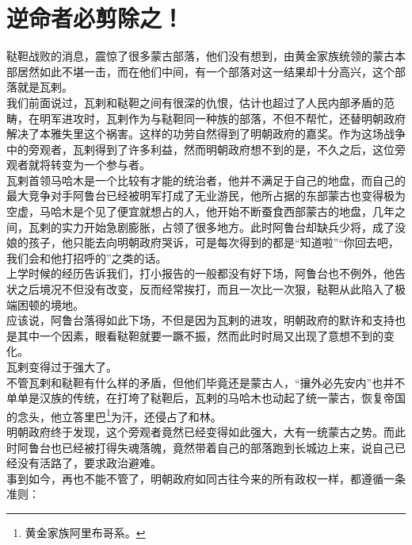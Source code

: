 \section{逆命者必剪除之！}
\ifnum{}
	\begin{multicols}{\theparacolNo}
\fi
鞑靼战败的消息，震惊了很多蒙古部落，他们没有想到，由黄金家族统领的蒙古本部居然如此不堪一击，而在他们中间，有一个部落对这一结果却十分高兴，这个部落就是瓦剌。\\

我们前面说过，瓦剌和鞑靼之间有很深的仇恨，估计也超过了人民内部矛盾的范畴，在明军进攻时，瓦剌作为与鞑靼同一种族的部落，不但不帮忙，还替明朝政府解决了本雅失里这个祸害。这样的功劳自然得到了明朝政府的嘉奖。作为这场战争中的旁观者，瓦剌得到了许多利益，然而明朝政府想不到的是，不久之后，这位旁观者就将转变为一个参与者。\\

瓦剌首领马哈木是一个比较有才能的统治者，他并不满足于自己的地盘，而自己的最大竞争对手阿鲁台已经被明军打成了无业游民，他所占据的东部蒙古也变得极为空虚，马哈木是个见了便宜就想占的人，他开始不断蚕食西部蒙古的地盘，几年之间，瓦剌的实力开始急剧膨胀，占领了很多地方。此时阿鲁台却缺兵少将，成了没娘的孩子，他只能去向明朝政府哭诉，可是每次得到的都是“知道啦”“你回去吧，我们会和他打招呼的”之类的话。\\

上学时候的经历告诉我们，打小报告的一般都没有好下场，阿鲁台也不例外，他告状之后境况不但没有改变，反而经常挨打，而且一次比一次狠，鞑靼从此陷入了极端困顿的境地。\\

应该说，阿鲁台落得如此下场，不但是因为瓦剌的进攻，明朝政府的默许和支持也是其中一个因素，眼看鞑靼就要一蹶不振，然而此时时局又出现了意想不到的变化。\\

瓦剌变得过于强大了。\\

不管瓦剌和鞑靼有什么样的矛盾，但他们毕竟还是蒙古人，“攘外必先安内”也并不单单是汉族的传统，在打垮了鞑靼后，瓦剌的马哈木也动起了统一蒙古，恢复帝国的念头，他立答里巴\footnote{黄金家族阿里布哥系。}为汗，还侵占了和林。\\

明朝政府终于发现，这个旁观者竟然已经变得如此强大，大有一统蒙古之势。而此时阿鲁台也已经被打得失魂落魄，竟然带着自己的部落跑到长城边上来，说自己已经没有活路了，要求政治避难。\\

事到如今，再也不能不管了，明朝政府如同古往今来的所有政权一样，都遵循一条准则：\\


\end{multicols}
